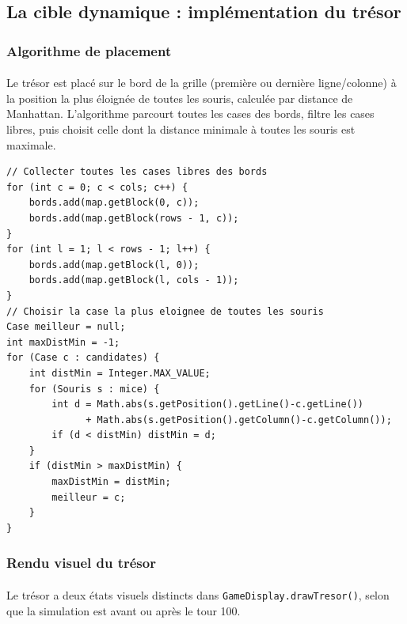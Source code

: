 \bigskip

\subsection{La cible dynamique : implémentation du trésor}

\subsubsection{Algorithme de placement}

\paragraph{} Le trésor est placé sur le bord de la grille (première ou dernière ligne/colonne) à la position la plus éloignée de toutes les souris, calculée par distance de Manhattan. L'algorithme parcourt toutes les cases des bords, filtre les cases libres, puis choisit celle dont la distance minimale à toutes les souris est maximale.

\begin{lstlisting}[caption={Placement du trésor sur le bord le plus éloigné}]
// Collecter toutes les cases libres des bords
for (int c = 0; c < cols; c++) {
    bords.add(map.getBlock(0, c));
    bords.add(map.getBlock(rows - 1, c));
}
for (int l = 1; l < rows - 1; l++) {
    bords.add(map.getBlock(l, 0));
    bords.add(map.getBlock(l, cols - 1));
}
// Choisir la case la plus eloignee de toutes les souris
Case meilleur = null;
int maxDistMin = -1;
for (Case c : candidates) {
    int distMin = Integer.MAX_VALUE;
    for (Souris s : mice) {
        int d = Math.abs(s.getPosition().getLine()-c.getLine())
              + Math.abs(s.getPosition().getColumn()-c.getColumn());
        if (d < distMin) distMin = d;
    }
    if (distMin > maxDistMin) {
        maxDistMin = distMin;
        meilleur = c;
    }
}
\end{lstlisting}

\subsubsection{Rendu visuel du trésor}

\paragraph{} Le trésor a deux états visuels distincts dans \texttt{GameDisplay.drawTresor()}, selon que la simulation est avant ou après le tour 100.

